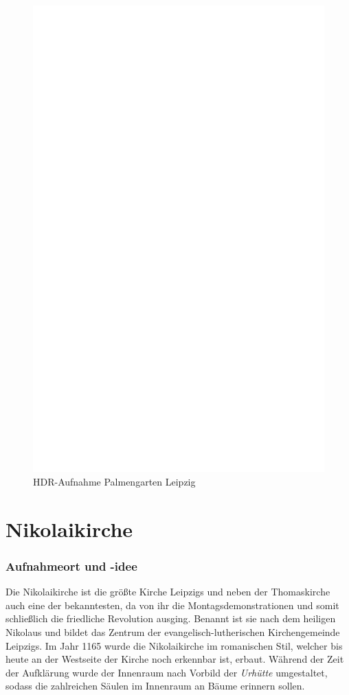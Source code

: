 \documentclass[liststotoc,bibtotoc,fontsize=14pt,]{scrreprt}
\begin{document}
\newpage
\begin{figure}[h]
	\includegraphics[width=\linewidth]{img/ph.jpg}
	\caption{HDR-Aufnahme Palmengarten Leipzig}
\end{figure}

\section{Nikolaikirche}
\label{sec:nikolai}
\subsubsection{Aufnahmeort und -idee}
Die Nikolaikirche ist die größte Kirche Leipzigs und neben der Thomaskirche auch eine der bekanntesten, da von ihr die Montagsdemonstrationen und somit schließlich die friedliche Revolution ausging. Benannt ist sie nach dem heiligen Nikolaus und bildet das Zentrum der evangelisch-lutherischen Kirchengemeinde Leipzigs. Im Jahr 1165 wurde die Nikolaikirche im romanischen Stil, welcher bis heute an der Westseite der Kirche noch erkennbar ist, erbaut. Während der Zeit der Aufklärung wurde der Innenraum nach Vorbild der \textit{Urhütte} umgestaltet, sodass die zahlreichen Säulen im Innenraum an Bäume erinnern sollen. 
\end{document}
